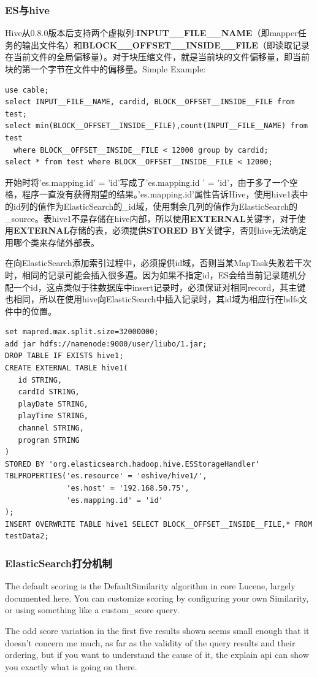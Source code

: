 \subsubsection{ES与hive}
\par Hive从0.8.0版本后支持两个虚拟列:\textbf{INPUT\_\_FILE\_\_NAME}（即mapper任务的输出文件名）和\textbf{BLOCK\_\_OFFSET\_\_INSIDE\_\_FILE}（即读取记录在当前文件的全局偏移量）。对于块压缩文件，就是当前块的文件偏移量，即当前块的第一个字节在文件中的偏移量。Simple Example:
\begin{verbatim}
use cable;
select INPUT__FILE__NAME, cardid, BLOCK__OFFSET__INSIDE__FILE from test;
select min(BLOCK__OFFSET__INSIDE__FILE),count(INPUT__FILE__NAME) from test
  where BLOCK__OFFSET__INSIDE__FILE < 12000 group by cardid;
select * from test where BLOCK__OFFSET__INSIDE__FILE < 12000;
\end{verbatim}
\par 开始时将'es.mapping.id' = 'id'写成了'es.mapping.id ' = 'id'，由于多了一个空格，程序一直没有获得期望的结果。'es.mapping.id'属性告诉Hive，使用hive1表中的id列的值作为ElasticSearch的\_id域，使用剩余几列的值作为ElasticSearch的\_source。表hive1不是存储在hive内部，所以使用\textbf{EXTERNAL}关键字，对于使用\textbf{EXTERNAL}存储的表，必须提供\textbf{STORED BY}关键字，否则hive无法确定用哪个类来存储外部表。
\par 在向ElasticSearch添加索引过程中，必须提供id域，否则当某MapTask失败若干次时，相同的记录可能会插入很多遍。因为如果不指定id，ES会给当前记录随机分配一个id，这点类似于往数据库中insert记录时，必须保证对相同record，其主键也相同，所以在使用hive向ElasticSearch中插入记录时，其id域为相应行在hdfs文件中的位置。
\begin{verbatim}
set mapred.max.split.size=32000000;
add jar hdfs://namenode:9000/user/liubo/1.jar;
DROP TABLE IF EXISTS hive1;
CREATE EXTERNAL TABLE hive1(
   id STRING,
   cardId STRING, 
   playDate STRING, 
   playTime STRING,
   channel STRING, 
   program STRING
)
STORED BY 'org.elasticsearch.hadoop.hive.ESStorageHandler'
TBLPROPERTIES('es.resource' = 'eshive/hive1/',
              'es.host' = '192.168.50.75',
              'es.mapping.id' = 'id'
);
INSERT OVERWRITE TABLE hive1 SELECT BLOCK__OFFSET__INSIDE__FILE,* FROM testData2;
\end{verbatim}
\subsubsection{ElasticSearch打分机制}
\par The default scoring is the DefaultSimilarity algorithm in core Lucene, largely documented here. You can customize scoring by configuring your own Similarity, or using something like a custom\_score query.
\par The odd score variation in the first five results shown seems small enough that it doesn't concern me much, as far as the validity of the query results and their ordering, but if you want to understand the cause of it, the explain api can show you exactly what is going on there.
